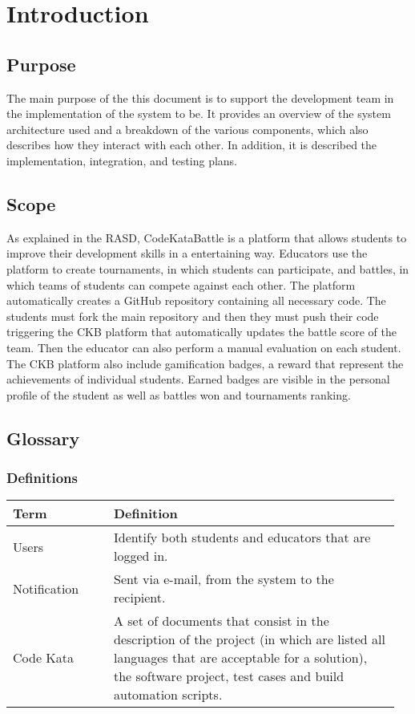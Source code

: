 \chapter{Introduction}
\section{Purpose}
The main purpose of the this document is to support the development team in the implementation of the system to be. \newline
It provides an overview of the system architecture used and a breakdown of the various 
components, which also describes how they interact with each other. \newline
In addition, it is described the implementation, integration, and testing plans.

\section{Scope}
As explained in the RASD, CodeKataBattle is a platform that allows students to improve their development skills in a entertaining way. \newline
Educators use the platform to create tournaments, in which students can participate, and battles, in which teams of students can compete against each other. \newline
The platform automatically creates a GitHub repository containing all necessary code. The students must fork the main repository and then they must push their code triggering the CKB platform that automatically updates the battle score of the team. Then the educator can also perform a manual evaluation on each student. \newline
The CKB platform also include gamification badges, a reward that represent the achievements of individual students. Earned badges are visible in the personal profile of the student as well as battles won and tournaments ranking.

\section{Glossary}
    \subsection{Definitions}
    \begin{center}
	\begin{tabular}{@{}p{0.25\linewidth} p{0.71\linewidth}@{}}
		\toprule
		\textbf{Term} & \textbf{Definition}\\
		\midrule
		Users & Identify both students and educators that are logged in. \\
            Notification & Sent via e-mail, from the system to the recipient. \\
            Code Kata & A set of documents that consist in the description of the project (in which are listed all languages that are acceptable for a solution), the software project, test cases and build automation scripts. \\
		\bottomrule
	\end{tabular}
    \end{center}
    
